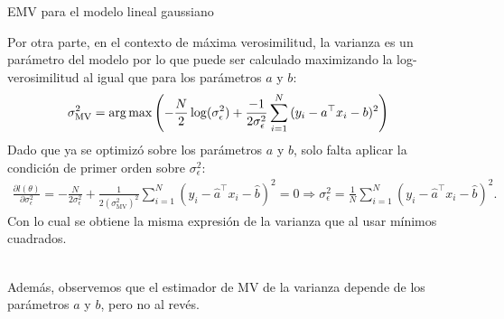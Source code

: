\documentclass[9pt]{beamer}
\begin{document}
\begin{frame}{EMV para el modelo lineal gaussiano}
	
Por otra parte, en el contexto de máxima verosimilitud, la varianza es un parámetro del modelo por lo que puede ser calculado maximizando la log-verosimilitud al igual que para los parámetros $a$ y $b$:
\begin{align*}
	\sigma^2_{\text{MV}} &= \operatorname*{arg\,max} \left(-\frac{N}{2} \log(\sigma_\epsilon^{2}) + \frac{-1}{2\sigma_\epsilon^2}\sum_{i=1}^N {(y_i-a^\top x_i -b)^2}\right) 
\end{align*}
Dado que ya se optimizó sobre los parámetros $a$ y $b$, solo falta aplicar  la condición de primer orden sobre $\sigma_\epsilon^2$:
\begin{align*}
	\frac{\partial l(\theta)}{\partial \sigma_\epsilon^2} = -\frac{N}{2\sigma_\epsilon^2} + \frac{1}{2(\sigma^2_{\text{MV}})^2}\sum_{i=1}^N {(y_i-\hat{a}^\top x_i -\hat{b})^2} = 0 \Rightarrow \sigma_\epsilon^2 = \frac{1}{N}\sum_{i=1}^N {(y_i-\hat{a}^\top x_i -\hat{b})^2}.
\end{align*}
Con lo cual se obtiene la misma expresión de la varianza que al usar mínimos cuadrados. \\~\

Además, observemos que el estimador de MV de la varianza depende de los parámetros $a$ y $b$, pero no al revés.
	
\end{frame}
\end{document}
